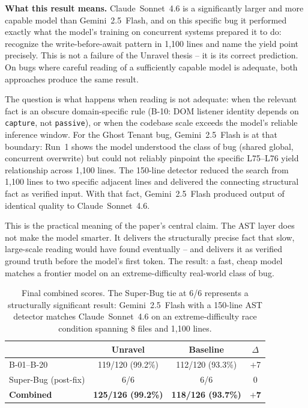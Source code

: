 \documentclass[12pt,a4paper]{article}
\newcommand{\code}[1]{\texttt{\small #1}}
\begin{document}
\textbf{What this result means.} Claude~Sonnet~4.6 is a significantly larger and more
capable model than Gemini~2.5~Flash, and on this specific bug it performed exactly what
the model's training on concurrent systems prepared it to do: recognize the write-before-await
pattern in 1,100 lines and name the yield point precisely. This is not a failure of the
Unravel thesis -- it is its correct prediction. On bugs where careful reading of a
sufficiently capable model is adequate, both approaches produce the same result.

The question is what happens when reading is not adequate: when the relevant fact is
an obscure domain-specific rule (B-10: DOM listener identity depends on \code{capture},
not \code{passive}), or when the codebase scale exceeds the model's reliable inference
window. For the Ghost Tenant bug, Gemini~2.5~Flash is at that boundary: Run~1 shows the
model understood the class of bug (shared global, concurrent overwrite) but could not
reliably pinpoint the specific L75--L76 yield relationship across 1,100 lines. The
150-line detector reduced the search from 1,100 lines to two specific adjacent lines
and delivered the connecting structural fact as verified input. With that fact,
Gemini~2.5~Flash produced output of identical quality to Claude~Sonnet~4.6.

This is the practical meaning of the paper's central claim. The AST layer does not make
the model smarter. It delivers the structurally precise fact that slow, large-scale
reading would have found eventually -- and delivers it as verified ground truth before
the model's first token. The result: a fast, cheap model matches a frontier model on
an extreme-difficulty real-world class of bug.

\begin{table}[H]
\centering\small
\begin{tabular}{@{}l cc c@{}}
\toprule
& \textbf{Unravel} & \textbf{Baseline} & \textbf{$\Delta$} \\
\midrule
B-01--B-20 & 119/120 (99.2\%) & 112/120 (93.3\%) & $+$7 \\
Super-Bug (post-fix) & 6/6 & 6/6 & 0 \\
\midrule
\textbf{Combined} & \textbf{125/126 (99.2\%)} & \textbf{118/126 (93.7\%)} & \textbf{$+$7} \\
\bottomrule
\end{tabular}
\caption{Final combined scores. The Super-Bug tie at 6/6 represents a structurally
significant result: Gemini~2.5~Flash with a 150-line AST detector matches
Claude~Sonnet~4.6 on an extreme-difficulty race condition spanning 8 files and 1,100 lines.}
\label{tab:final}
\end{table}
\end{document}
